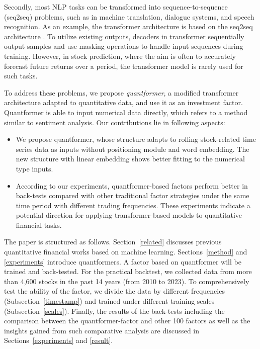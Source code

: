 \documentclass[preprint,12pt]{elsarticle}
\begin{document}
Secondly, most NLP tasks can be transformed into sequence-to-sequence (seq2seq) problems, such as in machine translation, dialogue systems, and speech recognition. As an example, the transformer architecture is based on the seq2seq architecture \citep{10.5555/3295222.3295349}. To utilize existing outputs, decoders in transformer sequentially output samples and use masking operations to handle input sequences during training. However, in stock prediction, where the aim is often to accurately forecast future returns over a period, the transformer model is rarely used for such tasks.

To address these problems, we propose \emph{quantformer}, a modified transformer architecture adapted to quantitative data, and use it as an investment factor. Quantformer is able to input numerical data directly, which refers to a method similar to sentiment analysis. Our contributions lie in following aspects:

\begin{itemize}
    \item We propose quantformer, whose structure adapts to rolling stock-related time series data as inputs without positioning module and word embedding. The new structure with linear embedding shows better fitting to the numerical type inputs.
    \item According to our experiments, quantformer-based factors perform better in back-tests compared with other traditional factor strategies under the same time period with different trading frequencies. These experiments indicate a potential direction for applying transformer-based models to quantitative financial tasks. 
\end{itemize}


The paper is structured as follows. Section~\ref{related} discusses previous quantitative financial works based on machine learning. Sections~\ref{method} and \ref{experiments} introduce quantformers. A factor based on quantformer will be trained and back-tested. For the practical backtest, we collected data from more than 4,600 stocks in the past 14 years (from 2010 to 2023). To comprehensively test the ability of the factor, we divide the data by different frequencies (Subsection~\ref{timestamp}) and trained under different training scales (Subsection~\ref{scales}). Finally, the results of the back-tests including the comparison between the quantformer-factor and other 100 factors as well as the insights gained from such comparative analysis are discussed in Sections~\ref{experiments} and \ref{result}. 
\end{document}
